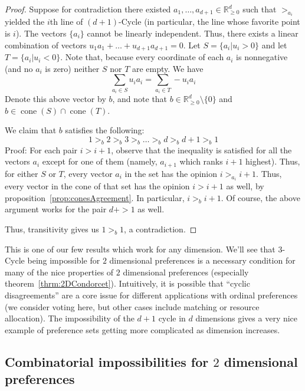 \documentclass[12pt]{article}
\newcommand{\Rgz}{\mathbb{R}_{\ge 0}}
\DeclareMathOperator*{\cone}{cone}
\newcommand{\1}[1]{\mathds{1}[{#1}]}
\begin{document}
    \begin{proof}
      Suppose for contradiction there existed
      $a_1,\ldots,a_{d+1}\in\Rgz^{d}$ such that $>_{a_i}$ yielded the $i$th line of
      $(d+1)$-{\sc Cycle} (in particular, the line whose favorite point is $i$).
      The vectors $\{a_i\}$ cannot be linearly independent.
      Thus, there exists a linear combination of vectors
      $u_1 a_1 + \ldots + u_{d+1} a_{d+1} = 0$.
      Let $S = \{a_i | u_i > 0\}$ and let $T = \{a_i | u_i < 0\}$.
      Note that, because every coordinate of each $a_i$ is nonnegative
      (and no $a_i$ is zero) neither $S$ nor $T$ are empty.
      We have
      \[ \sum_{a_i \in S} u_i a_i = \sum_{a_i \in T} -u_i a_i \]
      Denote this above vector by $b$, and note that 
      $b\in\Rgz^{d} \setminus \{0\}$ and $b\in \cone(S) \cap \cone(T)$.

      We claim that $b$ satisfies the following:
      \[ 1 >_b 2 >_b 3 >_b \ldots >_b d >_b d+1 >_b 1 \]
      Proof: For each pair $i > i+1$,
      observe that the inequality is satisfied for all the vectors $a_i$ except
      for one of them (namely, $a_{i+1}$ which ranks $i+1$ highest).
      Thus, for either $S$ or $T$, every vector $a_i$ in the set has the opinion
      $i >_{a_i} i+1$. Thus, every vector in the cone of that set
      has the opinion $i > i+1$ as well, by proposition~\ref{prop:conesAgreement}.
      In particular, $i >_b i+1$.
      Of course, the above argument works for the pair $d+>1$ as well.

      Thus, transitivity gives us $1>_b 1$, a contradiction.
    \end{proof}
    This is one of our few results which work for any dimension.
    We'll see that $3$-{Cycle} being impossible for $2$ dimensional preferences
    is a necessary condition for many of the nice properties of $2$ dimensional
    preferences (especially theorem~\ref{thrm:2DCondorcet}).
    Intuitively, it is possible that ``cyclic disagreements'' are a core issue for
    different applications with ordinal preferences (we consider voting here, but
    other cases include matching or resource allocation).
    The impossibility of the $d+1$ cycle in $d$ dimensions gives a
    very nice example of preference sets getting more complicated as
    dimension increases.


  \subsection{Combinatorial impossibilities for $2$ dimensional preferences}
\end{document}
